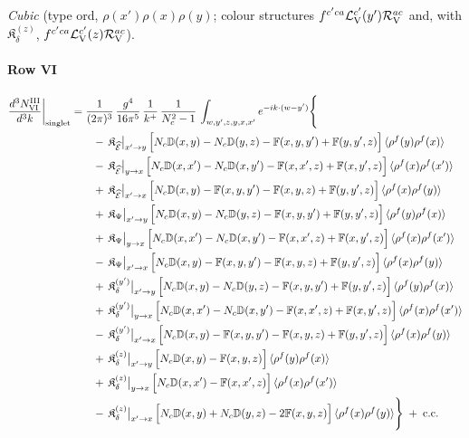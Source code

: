 \documentclass[10pt]{article}
\def\mf#1{\mathbb{#1}}
\begin{document}
\emph{Cubic} (type ord, $\rho(x')\rho(x)\rho(y)$; colour structures $f^{c'ca}\mathcal{L}^{c'}_{\rm V}(y')\mathcal{R}^{ac}_{\rm V}$ and, with $\mathfrak{K}_{\delta}^{(z)}$, $f^{c'ca}\mathcal{L}^{c'}_{\rm V}(z)\mathcal{R}^{ac}_{\rm V}$).
\paragraph*{Row VI}

\begin{align}
\frac{d^{3}N^{\rm III}_{\rm VI}}{d^{3}k}\bigg|_{\rm singlet}&=\frac{1}{(2\pi)^{3}}\,\frac{g^{4}}{16\pi^{5}}\,\frac{1}{k^{+}}\,\frac{1}{N_{c}^{2}-1}\,\int_{w,y',z,y,x,x'}e^{-ik\cdot(w-y')}\Bigg\{\notag\\
&\qquad -\,\mathfrak{K}_{\widehat{\mathcal{E}}}\big|_{x'\to y}\,\Big[N_{c}\mf{D}(x,y)-N_{c}\mf{D}(y,z)-\mf{F}(x,y,y')+\mf{F}(y,y',z)\Big]\,\langle\rho^{f}(y)\rho^{f}(x)\rangle\notag\\
&\qquad -\,\mathfrak{K}_{\widehat{\mathcal{E}}}\big|_{y\to x}\,\Big[N_{c}\mf{D}(x,x')-N_{c}\mf{D}(x,y')-\mf{F}(x,x',z)+\mf{F}(x,y',z)\Big]\,\langle\rho^{f}(x)\rho^{f}(x')\rangle\notag\\
&\qquad +\,\mathfrak{K}_{\widehat{\mathcal{E}}}\big|_{x'\to x}\,\Big[N_{c}\mf{D}(x,y)-\mf{F}(x,y,y')-\mf{F}(x,y,z)+\mf{F}(y,y',z)\Big]\,\langle\rho^{f}(x)\rho^{f}(y)\rangle\notag\\
&\qquad +\,\mathfrak{K}_{\Psi}\big|_{x'\to y}\,\Big[N_{c}\mf{D}(x,y)-N_{c}\mf{D}(y,z)-\mf{F}(x,y,y')+\mf{F}(y,y',z)\Big]\,\langle\rho^{f}(y)\rho^{f}(x)\rangle\notag\\
&\qquad +\,\mathfrak{K}_{\Psi}\big|_{y\to x}\,\Big[N_{c}\mf{D}(x,x')-N_{c}\mf{D}(x,y')-\mf{F}(x,x',z)+\mf{F}(x,y',z)\Big]\,\langle\rho^{f}(x)\rho^{f}(x')\rangle\notag\\
&\qquad -\,\mathfrak{K}_{\Psi}\big|_{x'\to x}\,\Big[N_{c}\mf{D}(x,y)-\mf{F}(x,y,y')-\mf{F}(x,y,z)+\mf{F}(y,y',z)\Big]\,\langle\rho^{f}(x)\rho^{f}(y)\rangle\notag\\
&\qquad +\,\mathfrak{K}_{\delta}^{(y')}\big|_{x'\to y}\,\Big[N_{c}\mf{D}(x,y)-N_{c}\mf{D}(y,z)-\mf{F}(x,y,y')+\mf{F}(y,y',z)\Big]\,\langle\rho^{f}(y)\rho^{f}(x)\rangle\notag\\
&\qquad +\,\mathfrak{K}_{\delta}^{(y')}\big|_{y\to x}\,\Big[N_{c}\mf{D}(x,x')-N_{c}\mf{D}(x,y')-\mf{F}(x,x',z)+\mf{F}(x,y',z)\Big]\,\langle\rho^{f}(x)\rho^{f}(x')\rangle\notag\\
&\qquad -\,\mathfrak{K}_{\delta}^{(y')}\big|_{x'\to x}\,\Big[N_{c}\mf{D}(x,y)-\mf{F}(x,y,y')-\mf{F}(x,y,z)+\mf{F}(y,y',z)\Big]\,\langle\rho^{f}(x)\rho^{f}(y)\rangle\notag\\
&\qquad +\,\mathfrak{K}_{\delta}^{(z)}\big|_{x'\to y}\,\Big[N_{c}\mf{D}(x,y)-\mf{F}(x,y,z)\Big]\,\langle\rho^{f}(y)\rho^{f}(x)\rangle\notag\\
&\qquad +\,\mathfrak{K}_{\delta}^{(z)}\big|_{y\to x}\,\Big[N_{c}\mf{D}(x,x')-\mf{F}(x,x',z)\Big]\,\langle\rho^{f}(x)\rho^{f}(x')\rangle\notag\\
&\qquad -\,\mathfrak{K}_{\delta}^{(z)}\big|_{x'\to x}\,\Big[N_{c}\mf{D}(x,y)+N_{c}\mf{D}(y,z)-2\mf{F}(x,y,z)\Big]\,\langle\rho^{f}(x)\rho^{f}(y)\rangle\Bigg\}\;+\;{\rm c.c.}\label{eq:s-III-VI}
\end{align}
\end{document}

